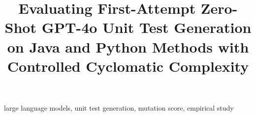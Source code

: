 \documentclass[conference]{IEEEtran}
\begin{document}
\title{Evaluating First-Attempt Zero-Shot GPT-4o Unit Test Generation on Java and Python Methods with Controlled Cyclomatic Complexity}

\author{
}

\maketitle

\begin{abstract}

\end{abstract}

\begin{IEEEkeywords}
large language models, unit test generation, mutation score, empirical study
\end{IEEEkeywords}











\end{document}
